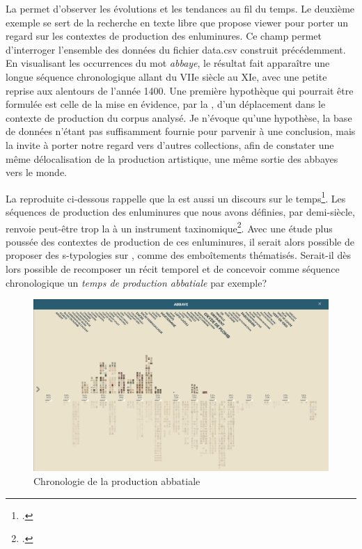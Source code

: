 La  permet d'observer les évolutions et les tendances au fil du temps. Le deuxième exemple se sert de la recherche en texte libre que propose  viewer pour porter un regard sur les contextes de production des enluminures. Ce champ permet d’interroger l’ensemble des données du fichier data.csv construit précédemment. En visualisant les occurrences du mot \textit{abbaye}, le résultat fait apparaître une longue séquence chronologique allant du VIIe siècle au XIe, avec une petite reprise aux alentours de l’année 1400. Une première hypothèque qui pourrait être formulée est celle de la mise en évidence, par la , d’un déplacement dans le contexte de production du corpus analysé. Je n’évoque qu’une hypothèse, la base de données n’étant pas suffisamment fournie pour parvenir à une conclusion, mais la  invite à porter notre regard vers d’autres collections, afin de constater une même délocalisation de la production artistique, une même sortie des abbayes vers le monde.\par
La  reproduite ci-dessous rappelle que la  est aussi un discours sur le temps\footcite{toubkis_ordre_2004}. Les séquences de production des enluminures que nous avons définies, par demi-siècle, renvoie peut-être trop la  à un instrument taxinomique\footcite{certeau_ecriture_1975}. Avec une étude plus poussée des contextes de production de ces enluminures, il serait alors possible de proposer des s-typologies sur , comme des emboîtements thématisés. Serait-il dès lors possible de recomposer un récit temporel et de concevoir comme séquence chronologique un \textit{temps de production abbatiale} par exemple?\par

\begin{figure}[H]
	\centering
	\includegraphics[width=\textwidth]{./textes/chap3/vikus-abbaye.jpg}
	\caption{Chronologie de la production abbatiale}
	\label{fig:info}
\end{figure}

